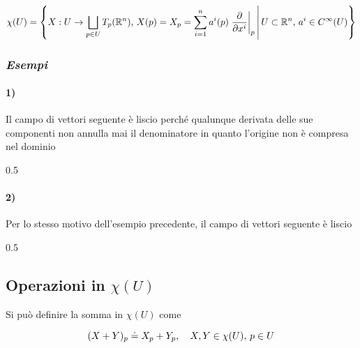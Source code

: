 \begin{equation}
	\chi(U) = \left\{ X : U \to \bigsqcup_{p \in U} T_{p}(\R^{n}), \, X(p) = X_{p} = \sum_{i=1}^{n} a^{i}(p) \eval{ \pdv{x^{i}} }_{p} \st U \subset \R^{n}, \, a^{i} \in C^{\infty}(U) \right\}
\end{equation}

\subsubsection{\textit{Esempi}}

\paragraph{1)}

Il campo di vettori seguente è liscio perché qualunque derivata delle sue componenti non annulla mai il denominatore in quanto l'origine non è compresa nel dominio

	{0.5}{%
		}

\paragraph{2)}

Per lo stesso motivo dell'esempio precedente, il campo di vettori seguente è liscio

	{0.5}{%
	}

\subsection{Operazioni in $ \chi(U) $}

Si può definire la somma in $ \chi(U) $ come

\begin{equation}
	(X+Y)_{p} \doteq X_{p} + Y_{p} %
	\qcomma X,Y \in \chi(U), \, p \in U
\end{equation}

